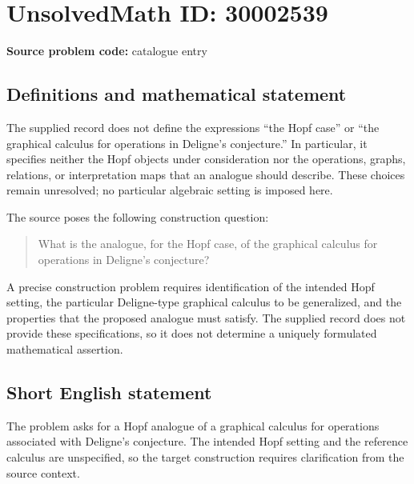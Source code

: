 \documentclass[11pt]{article}
\begin{document}
\section*{UnsolvedMath ID: 30002539}
\textbf{Source problem code:} catalogue entry
\subsection{Definitions and mathematical statement}
The supplied record does not define the expressions ``the Hopf case'' or ``the graphical calculus for operations in Deligne's conjecture.'' In particular, it specifies neither the Hopf objects under consideration nor the operations, graphs, relations, or interpretation maps that an analogue should describe. These choices remain unresolved; no particular algebraic setting is imposed here.

The source poses the following construction question:
\begin{quote}
What is the analogue, for the Hopf case, of the graphical calculus for operations in Deligne's conjecture?
\end{quote}
A precise construction problem requires identification of the intended Hopf setting, the particular Deligne-type graphical calculus to be generalized, and the properties that the proposed analogue must satisfy. The supplied record does not provide these specifications, so it does not determine a uniquely formulated mathematical assertion.
\subsection{Short English statement}
The problem asks for a Hopf analogue of a graphical calculus for operations associated with Deligne's conjecture. The intended Hopf setting and the reference calculus are unspecified, so the target construction requires clarification from the source context.
\end{document}
